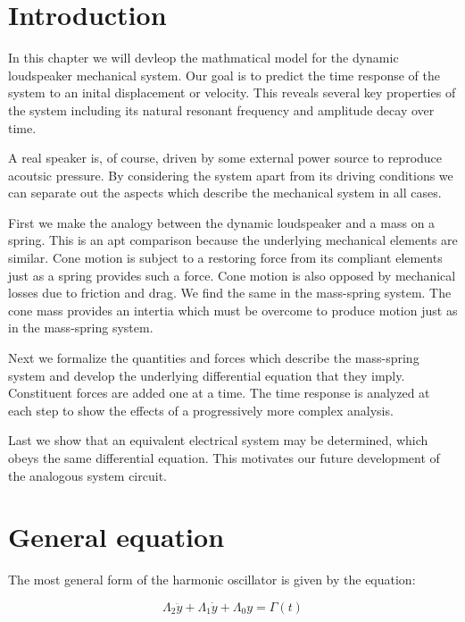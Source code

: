 \documentclass[11pt]{book}
\begin{document}

\section*{Introduction}

In this chapter we will devleop the mathmatical model for the dynamic
loudspeaker mechanical system.  Our goal is to predict the time response
of the system to an inital displacement or velocity.  This reveals
several key properties of the system including its natural resonant
frequency and amplitude decay over time.

A real speaker is, of course, driven by some external power source to
reproduce acoutsic pressure.  By considering the system apart from its
driving conditions we can separate out the aspects which describe the
mechanical system in all cases.

First we make the analogy between the dynamic loudspeaker and a mass
on a spring.  This is an apt comparison because the underlying
mechanical elements are similar.  Cone motion is subject to a
restoring force from its compliant elements just as a spring provides
such a force.  Cone motion is also opposed by mechanical
losses due to friction and drag.  We find the same in the mass-spring
system. The cone mass provides an intertia which must be
overcome to produce motion just as in the mass-spring system.

Next we formalize the quantities and forces which describe the
mass-spring system and develop the underlying differential equation
that they imply.  Constituent forces are added one at a time.  The
time response is analyzed at each step to show the effects of a
progressively more complex analysis.

Last we show that an equivalent electrical system may be determined,
which obeys the same differential equation.  This motivates our future
development of the analogous system circuit.



\section* {General equation}

The most general form of the harmonic oscillator is given by the
equation:

\begin{equation*}
  \Lambda_2 \ddot y + \Lambda_1 \dot y + \Lambda_0 y = \Gamma(t)
\end{equation*}
\end{document}
